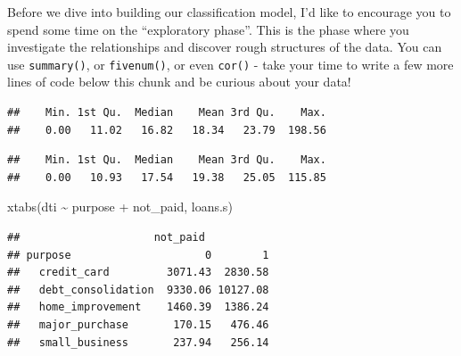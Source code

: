 \documentclass[
]{article}
\newenvironment{Shaded}{\begin{snugshade}}{\end{snugshade}}
\newcommand{\DecValTok}[1]{\textcolor[rgb]{0.00,0.00,0.81}{#1}}
\newcommand{\FunctionTok}[1]{\textcolor[rgb]{0.00,0.00,0.00}{#1}}
\newcommand{\NormalTok}[1]{#1}
\newcommand{\SpecialCharTok}[1]{\textcolor[rgb]{0.00,0.00,0.00}{#1}}
\newcommand{\StringTok}[1]{\textcolor[rgb]{0.31,0.60,0.02}{#1}}
\begin{document}
Before we dive into building our classification model, I'd like to
encourage you to spend some time on the ``exploratory phase''. This is
the phase where you investigate the relationships and discover rough
structures of the data. You can use \texttt{summary()}, or
\texttt{fivenum()}, or even \texttt{cor()} - take your time to write a
few more lines of code below this chunk and be curious about your data!

\begin{Shaded}
\end{Shaded}

\begin{verbatim}
##    Min. 1st Qu.  Median    Mean 3rd Qu.    Max. 
##    0.00   11.02   16.82   18.34   23.79  198.56
\end{verbatim}

\begin{Shaded}
\end{Shaded}

\begin{verbatim}
##    Min. 1st Qu.  Median    Mean 3rd Qu.    Max. 
##    0.00   10.93   17.54   19.38   25.05  115.85
\end{verbatim}

\begin{Shaded}
\begin{Highlighting}[]
\FunctionTok{xtabs}\NormalTok{(dti }\SpecialCharTok{\textasciitilde{}}\NormalTok{ purpose }\SpecialCharTok{+}\NormalTok{ not\_paid, loans.s)}
\end{Highlighting}
\end{Shaded}

\begin{verbatim}
##                     not_paid
## purpose                     0        1
##   credit_card         3071.43  2830.58
##   debt_consolidation  9330.06 10127.08
##   home_improvement    1460.39  1386.24
##   major_purchase       170.15   476.46
##   small_business       237.94   256.14
\end{verbatim}
\end{document}
